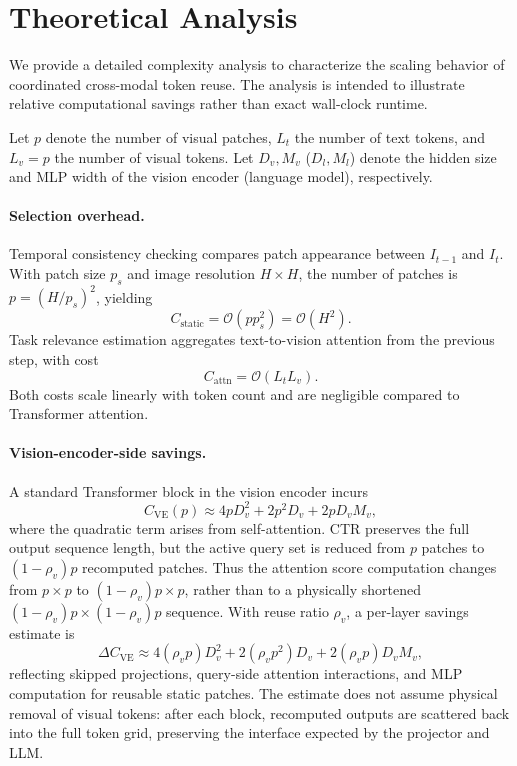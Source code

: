 \documentclass[11pt]{article}
\begin{document}
\section{Theoretical Analysis}
We provide a detailed complexity analysis to characterize the scaling behavior of coordinated cross-modal token reuse. The analysis is intended to illustrate relative computational savings rather than exact wall-clock runtime.

Let $p$ denote the number of visual patches, $L_t$ the number of text tokens, and $L_v=p$ the number of visual tokens. Let $D_v, M_v$ ($D_l, M_l$) denote the hidden size and MLP width of the vision encoder (language model), respectively.

\paragraph{Selection overhead.}
Temporal consistency checking compares patch appearance between $I_{t-1}$ and $I_t$. With patch size $p_s$ and image resolution $H \times H$, the number of patches is $p = (H / p_s)^2$, yielding
\begin{equation}
    C_{\text{static}} = \mathcal{O}(p p_s^2) = \mathcal{O}(H^2).
    \label{eq:static_cost}
\end{equation}
Task relevance estimation aggregates text-to-vision attention from the previous step, with cost
\begin{equation}
    C_{\text{attn}} = \mathcal{O}(L_t L_v).
    \label{eq:attn_filter}
\end{equation}
Both costs scale linearly with token count and are negligible compared to Transformer attention.

\paragraph{Vision-encoder-side savings.}
A standard Transformer block in the vision encoder incurs
\begin{equation}
    C_{\text{VE}}(p) \approx 4 p D_v^2 + 2 p^2 D_v + 2 p D_v M_v,
    \label{eq:vit_flops}
\end{equation}
where the quadratic term arises from self-attention. CTR preserves the full output sequence length, but the active query set is reduced from $p$ patches to $(1-\rho_v)p$ recomputed patches. Thus the attention score computation changes from $p \times p$ to $(1-\rho_v)p \times p$, rather than to a physically shortened $(1-\rho_v)p \times (1-\rho_v)p$ sequence. With reuse ratio $\rho_v$, a per-layer savings estimate is
\begin{equation}
\label{eq:vit_savings}
    \Delta C_{\text{VE}} \approx
    4(\rho_v p)D_v^2
    + 2(\rho_v p^2)D_v
    + 2(\rho_v p)D_v M_v,
\end{equation}
reflecting skipped projections, query-side attention interactions, and MLP computation for reusable static patches. The estimate does not assume physical removal of visual tokens: after each block, recomputed outputs are scattered back into the full token grid, preserving the interface expected by the projector and LLM.
\end{document}
